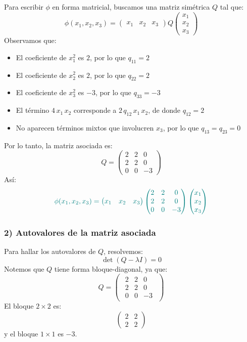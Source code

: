 \documentclass{article}
\begin{document}
Para escribir \(\phi\) en forma matricial, buscamos una matriz simétrica \(Q\) tal que:
\[
\phi(x_1,x_2,x_3) =
\begin{pmatrix}
x_1 & x_2 & x_3
\end{pmatrix}
Q
\begin{pmatrix}
x_1\\
x_2\\
x_3
\end{pmatrix}
\]
Observamos que:
\begin{itemize}
  \item El coeficiente de \(x_1^2\) es \(2\), por lo que \(q_{11} = 2\)
  \item El coeficiente de \(x_2^2\) es \(2\), por lo que \(q_{22} = 2\)
  \item El coeficiente de \(x_3^2\) es \(-3\), por lo que \(q_{33} = -3\)
  \item El término \(4\,x_1\,x_2\) corresponde a \(2\,q_{12}\,x_1\,x_2\), de donde \(q_{12} = 2\)
  \item No aparecen términos mixtos que involucren \(x_3\), por lo que \(q_{13} = q_{23} = 0\)
\end{itemize}
Por lo tanto, la matriz asociada es:
\[
Q =
\begin{pmatrix}
2 & 2 & 0\\
2 & 2 & 0\\
0 & 0 & -3
\end{pmatrix}
\]
Así:
\[
\color{teal}
\phi(x_1,x_2,x_3) =
\begin{pmatrix}
x_1 & x_2 & x_3
\end{pmatrix}
\begin{pmatrix}
2 & 2 & 0\\
2 & 2 & 0\\
0 & 0 & -3
\end{pmatrix}
\begin{pmatrix}
x_1\\
x_2\\
x_3
\end{pmatrix}
\]

\subsubsection*{2) Autovalores de la matriz asociada}

Para hallar los autovalores de \(Q\), resolvemos:
\[
\det(Q - \lambda I) = 0
\]
Notemos que \(Q\) tiene forma bloque-diagonal, ya que:
\[
Q =
\begin{pmatrix}
\begin{array}{cc|c}
2 & 2 & 0\\
2 & 2 & 0\\ \hline
0 & 0 & -3
\end{array}
\end{pmatrix}
\]
El bloque \(2\times2\) es:
\[
\begin{pmatrix}
2 & 2\\
2 & 2
\end{pmatrix}
\]
y el bloque \(1\times1\) es \(-3\).
\end{document}
